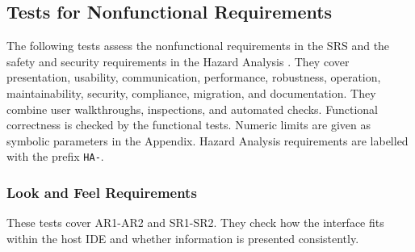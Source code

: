 \documentclass[12pt, titlepage]{article}
\begin{document}
\subsection{Tests for Nonfunctional Requirements}

The following tests assess the nonfunctional requirements in the SRS and the
safety and security requirements in the Hazard Analysis
\citep{HazardAnalysis}. They cover presentation, usability, communication,
performance, robustness, operation, maintainability, security, compliance,
migration, and documentation. They combine user walkthroughs, inspections, and
automated checks. Functional correctness is checked by the functional tests.
Numeric limits are given as symbolic parameters in the Appendix. Hazard
Analysis requirements are labelled with the prefix \texttt{HA-}.

\subsubsection{Look and Feel Requirements}

These tests cover AR1-AR2 and SR1-SR2. They check how the interface fits
within the host IDE and whether information is presented consistently.
\end{document}
